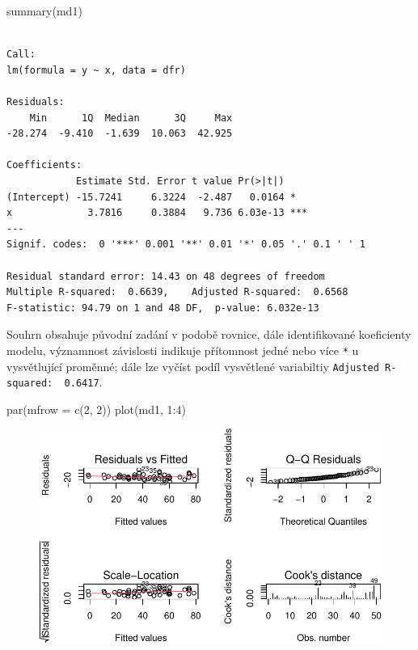 \documentclass[
  letterpaper,
  DIV=11,
  numbers=noendperiod]{scrreprt}
\newenvironment{Shaded}{\begin{snugshade}}{\end{snugshade}}
\newcommand{\AttributeTok}[1]{\textcolor[rgb]{0.40,0.45,0.13}{#1}}
\newcommand{\DecValTok}[1]{\textcolor[rgb]{0.68,0.00,0.00}{#1}}
\newcommand{\FunctionTok}[1]{\textcolor[rgb]{0.28,0.35,0.67}{#1}}
\newcommand{\NormalTok}[1]{\textcolor[rgb]{0.00,0.23,0.31}{#1}}
\newcommand{\SpecialCharTok}[1]{\textcolor[rgb]{0.37,0.37,0.37}{#1}}
\begin{document}
\begin{Shaded}
\begin{Highlighting}[]
\FunctionTok{summary}\NormalTok{(md1)}
\end{Highlighting}
\end{Shaded}

\begin{verbatim}

Call:
lm(formula = y ~ x, data = dfr)

Residuals:
    Min      1Q  Median      3Q     Max 
-28.274  -9.410  -1.639  10.063  42.925 

Coefficients:
            Estimate Std. Error t value Pr(>|t|)    
(Intercept) -15.7241     6.3224  -2.487   0.0164 *  
x             3.7816     0.3884   9.736 6.03e-13 ***
---
Signif. codes:  0 '***' 0.001 '**' 0.01 '*' 0.05 '.' 0.1 ' ' 1

Residual standard error: 14.43 on 48 degrees of freedom
Multiple R-squared:  0.6639,    Adjusted R-squared:  0.6568 
F-statistic: 94.79 on 1 and 48 DF,  p-value: 6.032e-13
\end{verbatim}

Souhrn obsahuje původní zadání v podobě rovnice, dále identifikované
koeficienty modelu, významnost závislosti indikuje přítomnost jedné nebo
více \texttt{*} u vysvětlující proměnné; dále lze vyčíst podíl
vysvětlené variabiltiy \texttt{Adjusted\ R-squared:\ \ 0.6417}.\\

\begin{Shaded}
\begin{Highlighting}[]
\FunctionTok{par}\NormalTok{(}\AttributeTok{mfrow =} \FunctionTok{c}\NormalTok{(}\DecValTok{2}\NormalTok{, }\DecValTok{2}\NormalTok{))}
\FunctionTok{plot}\NormalTok{(md1, }\DecValTok{1}\SpecialCharTok{:}\DecValTok{4}\NormalTok{)}
\end{Highlighting}
\end{Shaded}

\begin{figure}[H]

{\centering \includegraphics{11_korelace_regrese_files/figure-pdf/unnamed-chunk-9-1.pdf}

}

\end{figure}
\end{document}
